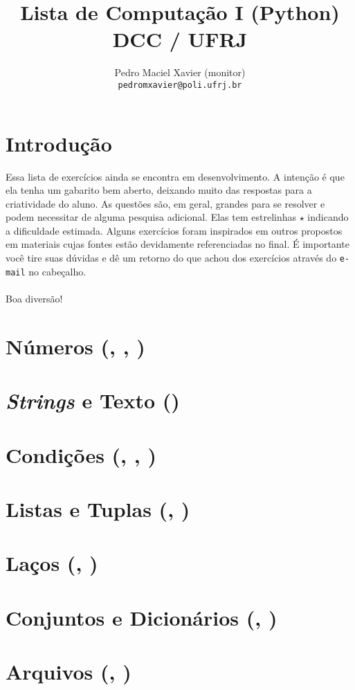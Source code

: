 \documentclass[12pt]{article}
\title{Lista de Computação I (Python) \\ {\normalsize DCC / UFRJ}}
\author{Pedro Maciel Xavier (monitor)\\ \texttt{pedromxavier@poli.ufrj.br}}
\begin{document}
	\maketitle
	\section*{Introdução}
	Essa lista de exercícios ainda se encontra em desenvolvimento. A intenção é que ela tenha um gabarito bem aberto, deixando muito das respostas para a criatividade do aluno. As questões são, em geral, grandes para se resolver e podem necessitar de alguma pesquisa adicional. Elas tem estrelinhas $\star$ indicando a dificuldade estimada. Alguns exercícios foram inspirados em outros propostos em materiais cujas fontes estão devidamente referenciadas no final. É importante você tire suas dúvidas e dê um retorno do que achou dos exercícios através do \texttt{e-mail} no cabeçalho.
	~\\
	~\\
	Boa diversão! \par
	\pagebreak
	
	
	\tableofcontents
	\pagebreak
	
	\section{Números (, , )}
	
	\section{\textit{Strings} e Texto ()}
	
	\section{Condições (, , )}
	
	\section{Listas e Tuplas (, )}	
	
	\section{Laços (, )}
	
	\section{Conjuntos e Dicionários (, )}
	
	\section{Arquivos (, )}
	
	
\end{document}
